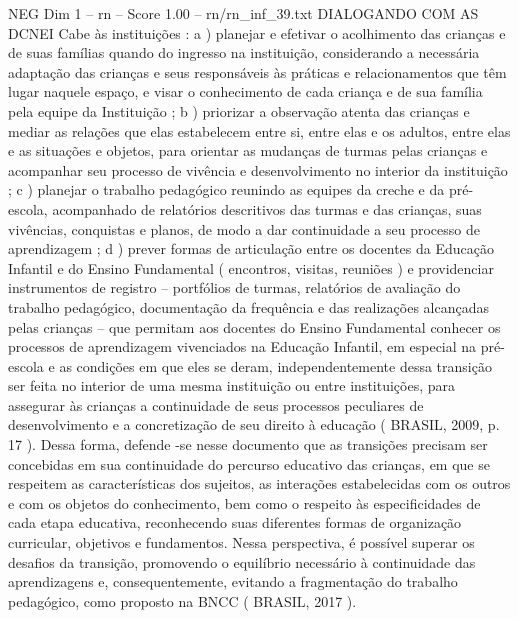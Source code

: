 \begin{textsample}{NEG Dim 1 – rn – Score 1.00 – rn/rn\_inf\_39.txt}  \label{ex:f1_neg_022}
DIALOGANDO COM AS DCNEI Cabe às instituições : a ) planejar e efetivar o acolhimento das crianças e de suas famílias quando do ingresso na instituição, considerando a necessária adaptação das crianças e seus responsáveis às práticas e relacionamentos que têm lugar naquele espaço, e visar o conhecimento de cada criança e de sua família pela equipe da Instituição ; b ) priorizar a observação atenta das crianças e mediar as relações que elas estabelecem entre si, entre elas e os adultos, entre elas e as situações e objetos, para orientar as mudanças de turmas pelas crianças e acompanhar seu processo de vivência e desenvolvimento no interior da instituição ; c ) planejar o trabalho pedagógico reunindo as equipes da creche e da pré-escola, acompanhado de relatórios descritivos das turmas e das crianças, suas vivências, conquistas e planos, de modo a dar continuidade a seu processo de aprendizagem ; d ) prever formas de articulação entre os docentes da Educação Infantil e do Ensino Fundamental ( encontros, visitas, reuniões ) e providenciar instrumentos de registro – portfólios de turmas, relatórios de avaliação do trabalho pedagógico, documentação da frequência e das realizações alcançadas pelas crianças – que permitam aos docentes do Ensino Fundamental conhecer os processos de aprendizagem vivenciados na Educação Infantil, em especial na pré-escola e as condições em que eles se deram, independentemente dessa transição ser feita no interior de uma mesma instituição ou entre instituições, para assegurar às crianças a continuidade de seus processos peculiares de desenvolvimento e a concretização de seu direito à educação ( BRASIL, 2009, p. 17 ).
Dessa forma, defende -se nesse documento que as transições precisam ser concebidas em sua continuidade do percurso educativo das crianças, em que se respeitem as características dos sujeitos, as interações estabelecidas com os outros e com os objetos do conhecimento, bem como o respeito às especificidades de cada etapa educativa, reconhecendo suas diferentes formas de organização curricular, objetivos e fundamentos.
Nessa perspectiva, é possível superar os desafios da transição, promovendo o equilíbrio necessário à continuidade das aprendizagens e, consequentemente, evitando a fragmentação do trabalho pedagógico, como proposto na BNCC ( BRASIL, 2017 ).

\end{textsample}
